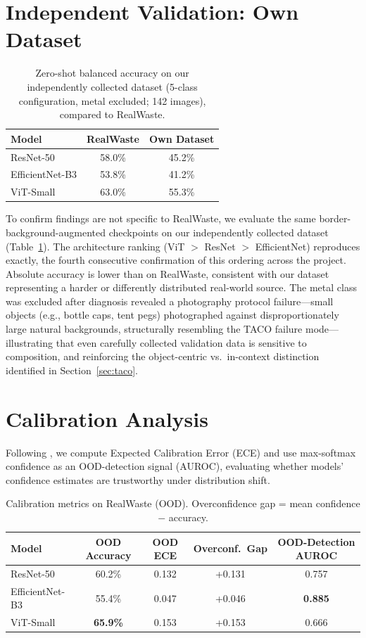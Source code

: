 \documentclass[a4paper]{article}
\begin{document}
\section{Independent Validation: Own Dataset}
\label{sec:owndataset}

\begin{table}[t]
\caption{Zero-shot balanced accuracy on our independently collected dataset (5-class configuration, metal excluded; 142 images), compared to RealWaste.}
\label{tab:owndataset}
\centering
\begin{tabular}{lcc}
\toprule
Model & RealWaste & Own Dataset \\
\midrule
ResNet-50 & 58.0\% & 45.2\% \\
EfficientNet-B3 & 53.8\% & 41.2\% \\
ViT-Small & 63.0\% & 55.3\% \\
\bottomrule
\end{tabular}
\end{table}

To confirm findings are not specific to RealWaste, we evaluate the same border-background-augmented checkpoints on our independently collected dataset (Table~\ref{tab:owndataset}). The architecture ranking (ViT $>$ ResNet $>$ EfficientNet) reproduces exactly, the fourth consecutive confirmation of this ordering across the project. Absolute accuracy is lower than on RealWaste, consistent with our dataset representing a harder or differently distributed real-world source. The metal class was excluded after diagnosis revealed a photography protocol failure---small objects (e.g., bottle caps, tent pegs) photographed against disproportionately large natural backgrounds, structurally resembling the TACO failure mode---illustrating that even carefully collected validation data is sensitive to composition, and reinforcing the object-centric vs.\ in-context distinction identified in Section~\ref{sec:taco}.

\section{Calibration Analysis}
\label{sec:calibration}

Following \citet{guo2017calibration}, we compute Expected Calibration Error (ECE) and use max-softmax confidence as an OOD-detection signal (AUROC), evaluating whether models' confidence estimates are trustworthy under distribution shift.

\begin{table}[t]
\caption{Calibration metrics on RealWaste (OOD). Overconfidence gap = mean confidence $-$ accuracy.}
\label{tab:calibration}
\centering
\begin{tabular}{lcccc}
\toprule
Model & OOD Accuracy & OOD ECE & Overconf.\ Gap & OOD-Detection AUROC \\
\midrule
ResNet-50 & 60.2\% & 0.132 & +0.131 & 0.757 \\
EfficientNet-B3 & 55.4\% & 0.047 & +0.046 & \textbf{0.885} \\
ViT-Small & \textbf{65.9\%} & 0.153 & +0.153 & 0.666 \\
\bottomrule
\end{tabular}
\end{table}
\end{document}
